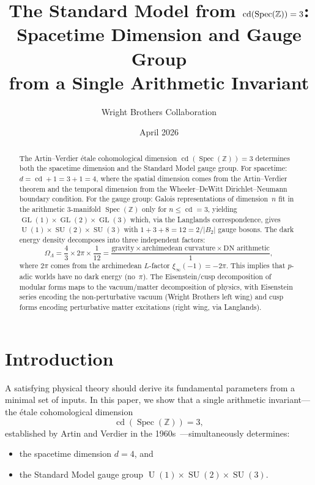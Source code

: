 \documentclass[12pt,a4paper]{article}
\title{\textbf{The Standard Model from $\cd(\Spec(\Z))=3$:\\
Spacetime Dimension and Gauge Group\\
from a Single Arithmetic Invariant}}
\author{Wright Brothers Collaboration}
\date{April 2026}
\theoremstyle{definition}
\newcommand{\Spec}{\operatorname{Spec}}
\newcommand{\GL}{\operatorname{GL}}
\newcommand{\SU}{\operatorname{SU}}
\newcommand{\cd}{\operatorname{cd}}
\newcommand{\Z}{\mathbb{Z}}
\newcommand{\OmL}{\Omega_\Lambda}
\newcommand{\U}{\operatorname{U}}
\begin{document}
\maketitle

\begin{abstract}
The Artin--Verdier \'etale cohomological dimension $\cd(\Spec(\Z))=3$
determines both the spacetime dimension and the Standard Model gauge group.
For spacetime: $d = \cd + 1 = 3+1 = 4$, where the spatial dimension comes
from the Artin--Verdier theorem and the temporal dimension from the
Wheeler--DeWitt Dirichlet--Neumann boundary condition.
For the gauge group: Galois representations of dimension~$n$ fit in the
arithmetic $3$-manifold $\Spec(\Z)$ only for $n \le \cd = 3$, yielding
$\GL(1)\times\GL(2)\times\GL(3)$ which, via the Langlands correspondence,
gives $\U(1)\times\SU(2)\times\SU(3)$ with $1+3+8 = 12 = 2/|B_2|$ gauge
bosons.
The dark energy density decomposes into three independent factors:
\[
  \OmL = \frac{4}{3}\times 2\pi \times \frac{1}{12}
       = \frac{\text{gravity}\times\text{archimedean curvature}
               \times\text{DN arithmetic}}{1},
\]
where $2\pi$ comes from the archimedean $L$-factor $\xi_\infty(-1)=-2\pi$.
This implies that $p$-adic worlds have no dark energy (no~$\pi$).
The Eisenstein/cusp decomposition of modular forms maps to the
vacuum/matter decomposition of physics, with Eisenstein series encoding
the non-perturbative vacuum (Wright Brothers left wing) and cusp forms
encoding perturbative matter excitations (right wing, via Langlands).
\end{abstract}

\tableofcontents

\section{Introduction}\label{sec:intro}

A satisfying physical theory should derive its fundamental parameters
from a minimal set of inputs.
In this paper, we show that a single arithmetic invariant---the \'etale
cohomological dimension
\begin{equation}\label{eq:cd3}
  \cd(\Spec(\Z)) = 3,
\end{equation}
established by Artin and Verdier in the 1960s~\cite{ArtinVerdier}---simultaneously
determines:
\begin{itemize}
  \item the spacetime dimension $d=4$, and
  \item the Standard Model gauge group $\U(1)\times\SU(2)\times\SU(3)$.
\end{itemize}
\end{document}
